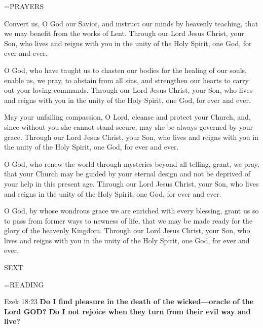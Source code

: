 \hangindent=\parindent \small PRAYERS
\begin{description}[labelindent=\parindent, noitemsep, leftmargin=*]
\item [Week 1:] 	Convert us, O God our Savior, and instruct our minds by heavenly teaching, that we may benefit from the works of Lent. Through our Lord Jesus Christ, your Son, who lives and reigns with you in the unity of the Holy Spirit, one God, for ever and ever.
\item [Week 2:] 	O God, who have taught us to chasten our bodies for the healing of our souls, enable us, we pray, to abstain from all sins, and strengthen our hearts to carry out your loving commands. Through our Lord Jesus Christ, your Son, who lives and reigns with you in the unity of the Holy Spirit, one God, for ever and ever.
\item [Week 3:] 	May your unfailing compassion, O Lord, cleanse and protect your Church, and, since without you she cannot stand secure, may she be always governed by your grace. Through our Lord Jesus Christ, your Son, who lives and reigns with you in the unity of the Holy Spirit, one God, for ever and ever.
\item [Week 4:] 	O God, who renew the world through mysteries beyond all telling, grant, we pray, that your Church may be guided by your eternal design and not be deprived of your help in this present age. Through our Lord Jesus Christ, your Son, who lives and reigns in the unity of the Holy Spirit, one God, for ever and ever.
\item [Week 5:] 	O God, by whose wondrous grace we are enriched with every blessing, grant us so to pass from former ways to newness of life, that we may be made ready for the glory of the heavenly Kingdom. Through our Lord Jesus Christ, your Son, who lives and reigns with you in the unity of the Holy Spirit, one God, for ever and ever.
\end{description}

\begin{flushleft}\normalsize SEXT\\\end{flushleft}
\hangindent=\parindent \small READING
\begin{description}[labelindent=\parindent, leftmargin=*]
\item [Weeks 1-4:]     Ezek 18:23 \textbf{    Do I find pleasure in the death of the wicked—oracle of the Lord GOD? Do I not rejoice when they turn from their evil way and live? }
\end{description}


